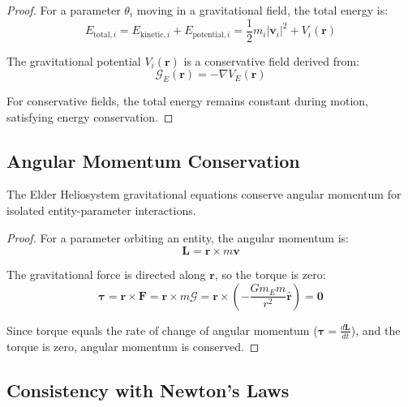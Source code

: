 \begin{proof}
For a parameter $\theta_i$ moving in a gravitational field, the total energy is:
\begin{equation}
E_{\text{total},i} = E_{\text{kinetic},i} + E_{\text{potential},i} = \frac{1}{2}m_i|\mathbf{v}_i|^2 + V_i(\mathbf{r})
\end{equation}

The gravitational potential $V_i(\mathbf{r})$ is a conservative field derived from:
\begin{equation}
\mathcal{G}_E(\mathbf{r}) = -\nabla V_E(\mathbf{r})
\end{equation}

For conservative fields, the total energy remains constant during motion, satisfying energy conservation.
\end{proof}

\subsection{Angular Momentum Conservation}

\begin{theorem}
The Elder Heliosystem gravitational equations conserve angular momentum for isolated entity-parameter interactions.
\end{theorem}

\begin{proof}
For a parameter orbiting an entity, the angular momentum is:
\begin{equation}
\mathbf{L} = \mathbf{r} \times m\mathbf{v}
\end{equation}

The gravitational force is directed along $\mathbf{r}$, so the torque is zero:
\begin{equation}
\boldsymbol{\tau} = \mathbf{r} \times \mathbf{F} = \mathbf{r} \times m\mathcal{G} = \mathbf{r} \times \left(-\frac{Gm_Em}{r^2}\hat{\mathbf{r}}\right) = \mathbf{0}
\end{equation}

Since torque equals the rate of change of angular momentum ($\boldsymbol{\tau} = \frac{d\mathbf{L}}{dt}$), and the torque is zero, angular momentum is conserved.
\end{proof}

\subsection{Consistency with Newton's Laws}

